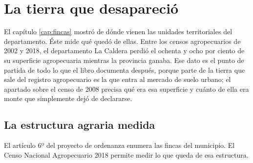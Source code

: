 \chapter{La tierra que desapareció}

\label{cap:tierra}
El capítulo \ref{cap:fincas} mostró de dónde vienen las unidades territoriales del departamento.
Éste mide qué quedó de ellas. Entre los censos agropecuarios de 2002 y 2018, el
departamento La Caldera perdió el ochenta y ocho por ciento de su superficie agropecuaria
mientras la provincia ganaba. Ese dato es el punto de partida de todo lo que el libro documenta después, porque parte de la tierra que sale del registro agropecuario es la que entra al mercado de suelo urbano; el apartado sobre el censo de 2008 precisa qué era esa superficie y cuánto de ella era monte que simplemente dejó de declararse.

\section{La estructura agraria medida}

El artículo 6º del proyecto de ordenanza enumera las fincas del municipio. El Censo Nacional Agropecuario 2018 permite medir lo que queda de esa estructura.

